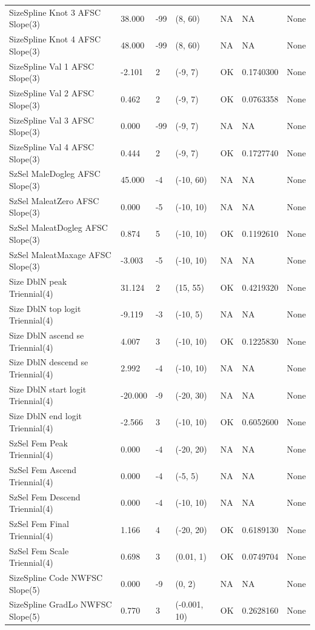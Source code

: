 \documentclass[11pt,
  english,
  a4paper,
]{article}
\begin{document}
\begin{landscape}
\begin{longtable}[t]{>{\raggedright\arraybackslash}p{7cm}lllll>{\raggedright\arraybackslash}p{4cm}}
SizeSpline Knot 3 AFSC Slope(3) & 38.000 & -99 & (8, 60) & NA & NA & None\\
SizeSpline Knot 4 AFSC Slope(3) & 48.000 & -99 & (8, 60) & NA & NA & None\\
SizeSpline Val 1 AFSC Slope(3) & -2.101 & 2 & (-9, 7) & OK & 0.1740300 & None\\
SizeSpline Val 2 AFSC Slope(3) & 0.462 & 2 & (-9, 7) & OK & 0.0763358 & None\\
SizeSpline Val 3 AFSC Slope(3) & 0.000 & -99 & (-9, 7) & NA & NA & None\\
SizeSpline Val 4 AFSC Slope(3) & 0.444 & 2 & (-9, 7) & OK & 0.1727740 & None\\
SzSel MaleDogleg AFSC Slope(3) & 45.000 & -4 & (-10, 60) & NA & NA & None\\
SzSel MaleatZero AFSC Slope(3) & 0.000 & -5 & (-10, 10) & NA & NA & None\\
SzSel MaleatDogleg AFSC Slope(3) & 0.874 & 5 & (-10, 10) & OK & 0.1192610 & None\\
SzSel MaleatMaxage AFSC Slope(3) & -3.003 & -5 & (-10, 10) & NA & NA & None\\
Size DblN peak Triennial(4) & 31.124 & 2 & (15, 55) & OK & 0.4219320 & None\\
Size DblN top logit Triennial(4) & -9.119 & -3 & (-10, 5) & NA & NA & None\\
Size DblN ascend se Triennial(4) & 4.007 & 3 & (-10, 10) & OK & 0.1225830 & None\\
Size DblN descend se Triennial(4) & 2.992 & -4 & (-10, 10) & NA & NA & None\\
Size DblN start logit Triennial(4) & -20.000 & -9 & (-20, 30) & NA & NA & None\\
Size DblN end logit Triennial(4) & -2.566 & 3 & (-10, 10) & OK & 0.6052600 & None\\
SzSel Fem Peak Triennial(4) & 0.000 & -4 & (-20, 20) & NA & NA & None\\
SzSel Fem Ascend Triennial(4) & 0.000 & -4 & (-5, 5) & NA & NA & None\\
SzSel Fem Descend Triennial(4) & 0.000 & -4 & (-10, 10) & NA & NA & None\\
SzSel Fem Final Triennial(4) & 1.166 & 4 & (-20, 20) & OK & 0.6189130 & None\\
SzSel Fem Scale Triennial(4) & 0.698 & 3 & (0.01, 1) & OK & 0.0749704 & None\\
SizeSpline Code NWFSC Slope(5) & 0.000 & -9 & (0, 2) & NA & NA & None\\
SizeSpline GradLo NWFSC Slope(5) & 0.770 & 3 & (-0.001, 10) & OK & 0.2628160 & None\\

\end{longtable}
\end{landscape}
\end{document}
